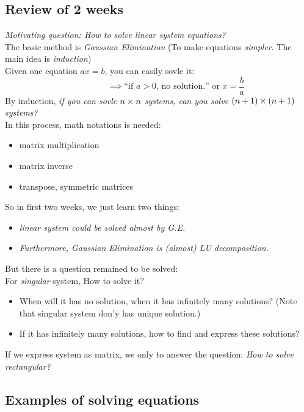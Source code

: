 \newpage

\subsection{Review of 2 weeks}
\emph{Motivating question: How to solve linear system equations?}\\
The basic method is \emph{Gaussian Elimination} (To make equations \textit{simpler}. The main idea is \textit{induction})\\
\hspace*{1cm}Given one equation $ax=b$, you can easily sovle it:
\[
\qquad\qquad \implies \text{``if $a>0$, no solution.'' or }x=\frac{b}{a} 
\]
\hspace*{1cm}By induction, \textit{if you can sovle $n\times n$ systems, can you solve $(n+1)\times(n+1)$ systems?}\\
In this process, math notations is needed:
\begin{itemize}
\item
matrix multiplication
\item
matrix inverse
\item
transpose, symmetric matrices
\end{itemize}
So in first two weeks, we just learn two things:
\begin{itemize}
\item
\textit{linear system could be solved \emph{almost} by G.E.}
\item
\textit{Furthermore, Gaussian Elimination is (almost) LU decomposition.}
\end{itemize}
But there is a question remained to be solved:\\
\hspace*{1cm}For \emph{singular} system, How to solve it?
\begin{itemize}
\item
When will it has no solution, when it has infinitely many solutions? (Note that singular system don'y has unique solution.)
\item
If it has infinitely many solutions, how to find and express these solutions?
\end{itemize}
If we express system as matrix, we only to answer the question: \emph{How to solve rectangular?}\\
\subsection{Examples of solving equations}

